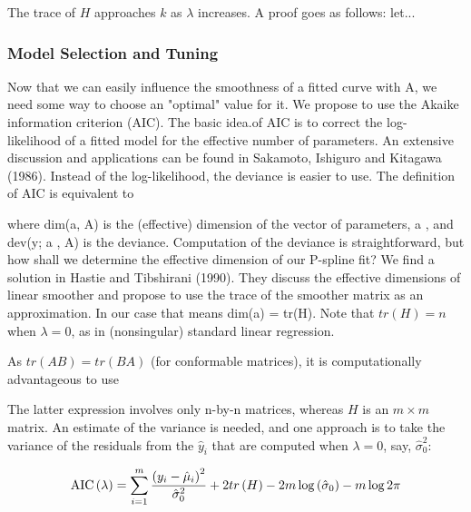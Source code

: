 \documentclass[12pt]{article}
\newcommand*\needsparaphrased{\color{red}}
\newcommand*\outlineskeleton{\color{green}}
\begin{document}
{\needsparaphrased The trace of $H$ approaches $k$ as $\lambda$ increases. A proof goes as follows: let...}

\subsubsection{{\outlineskeleton Model Selection and Tuning}}
{\needsparaphrased  Now that we can easily influence the smoothness of a fitted curve with A, we need some way to choose an "optimal" value for it. We propose to use the Akaike information criterion (AIC). The basic idea.of AIC is to correct the log- likelihood of a fitted model for the effective number of parameters. An extensive discussion and applications can be found in Sakamoto, Ishiguro and Kitagawa (1986). Instead of the log-likelihood, the deviance is easier to use. The definition of AIC is equivalent to}

{\needsparaphrased where dim(a, A) is the (effective) dimension of the vector of parameters, a , and dev(y; a , A) is the deviance.
Computation of the deviance is straightforward, but how shall we determine the effective dimension of our P-spline fit? We find a solution in Hastie and Tibshirani (1990). They discuss the effective dimensions of linear smoother and propose to use the trace of the smoother matrix as an approximation. In our case that means dim(a) = tr(H). Note that $tr\left(H\right) = n$ when $\lambda = 0$, as in (nonsingular) standard linear regression. 

As $tr\left(AB\right) = tr\left(BA\right)$ (for conformable matrices), it is computationally advantageous to use}

{\needsparaphrased The latter expression involves only n-by-n matrices, whereas $H$ is an $m \times m$ matrix. An estimate of the variance is needed, and one approach is to take the variance of the residuals from the $\hat{y}_i$ that are computed when $\lambda = 0$, say, $\hat{\sigma}_0^2$:}

\begin{equation} \label{eq:univariate_AIC}
\textup{AIC}\left(\lambda\right) = \sum_{i=1}^m \frac{\left( y_i - \hat{\mu}_i \right)^2}{\hat{\sigma}_0^2} + 2tr\left(H\right) - 2m\log\left(\hat{\sigma}_0\right) - m\log 2\pi
\end{equation}
\end{document}
